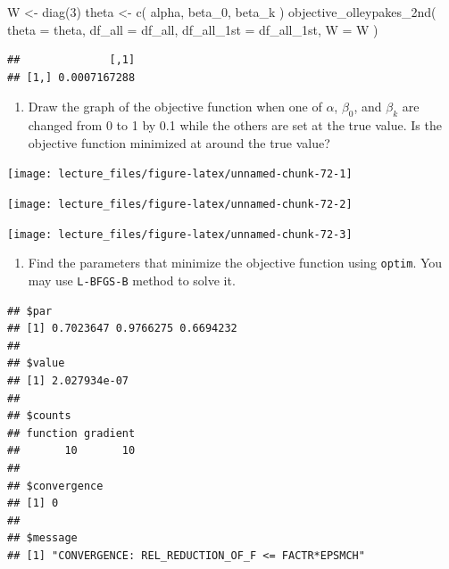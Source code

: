 \documentclass[
]{book}
\newenvironment{Shaded}{\begin{snugshade}}{\end{snugshade}}
\newcommand{\AttributeTok}[1]{\textcolor[rgb]{0.77,0.63,0.00}{#1}}
\newcommand{\DecValTok}[1]{\textcolor[rgb]{0.00,0.00,0.81}{#1}}
\newcommand{\FunctionTok}[1]{\textcolor[rgb]{0.00,0.00,0.00}{#1}}
\newcommand{\NormalTok}[1]{#1}
\newcommand{\OtherTok}[1]{\textcolor[rgb]{0.56,0.35,0.01}{#1}}
\providecommand{\tightlist}{%
  \setlength{\itemsep}{0pt}\setlength{\parskip}{0pt}}
\begin{document}
\begin{Shaded}
\begin{Highlighting}[]
\NormalTok{W }\OtherTok{\textless{}{-}} \FunctionTok{diag}\NormalTok{(}\DecValTok{3}\NormalTok{)}
\NormalTok{theta }\OtherTok{\textless{}{-}} 
  \FunctionTok{c}\NormalTok{(}
\NormalTok{    alpha, }
\NormalTok{    beta\_0, }
\NormalTok{    beta\_k}
\NormalTok{    )}
\FunctionTok{objective\_olleypakes\_2nd}\NormalTok{(}
  \AttributeTok{theta =}\NormalTok{ theta, }
  \AttributeTok{df\_all =}\NormalTok{ df\_all, }
  \AttributeTok{df\_all\_1st =}\NormalTok{ df\_all\_1st,}
  \AttributeTok{W =}\NormalTok{ W}
\NormalTok{  )}
\end{Highlighting}
\end{Shaded}

\begin{verbatim}
##              [,1]
## [1,] 0.0007167288
\end{verbatim}

\begin{enumerate}
\def\labelenumi{\arabic{enumi}.}
\setcounter{enumi}{7}
\tightlist
\item
  Draw the graph of the objective function when one of \(\alpha\), \(\beta_0\), and \(\beta_k\) are changed from 0 to 1 by 0.1 while the others are set at the true value. Is the objective function minimized at around the true value?
\end{enumerate}

\begin{center}\texttt{[image: lecture\_files/figure-latex/unnamed-chunk-72-1]} \end{center}

\begin{center}\texttt{[image: lecture\_files/figure-latex/unnamed-chunk-72-2]} \end{center}

\begin{center}\texttt{[image: lecture\_files/figure-latex/unnamed-chunk-72-3]} \end{center}

\begin{enumerate}
\def\labelenumi{\arabic{enumi}.}
\setcounter{enumi}{8}
\tightlist
\item
  Find the parameters that minimize the objective function using \texttt{optim}. You may use \texttt{L-BFGS-B} method to solve it.
\end{enumerate}

\begin{verbatim}
## $par
## [1] 0.7023647 0.9766275 0.6694232
## 
## $value
## [1] 2.027934e-07
## 
## $counts
## function gradient 
##       10       10 
## 
## $convergence
## [1] 0
## 
## $message
## [1] "CONVERGENCE: REL_REDUCTION_OF_F <= FACTR*EPSMCH"
\end{verbatim}
\end{document}
